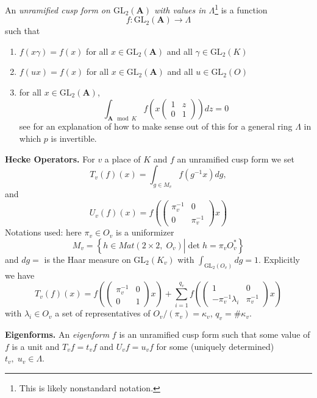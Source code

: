 \begin{definition}
\label{definition-unramified}
An {\it unramified cusp form on $\text{GL}_2(\mathbf{A})$ with values in
$\Lambda$}\footnote{This is likely nonstandard notation.}
is a function
$$
f: \text{GL}_2(\mathbf{A}) \to \Lambda
$$
such that
\begin{enumerate}
\item $f(x\gamma) = f(x)$ for all $x\in \text{GL}_2(\mathbf{A})$ and all
$\gamma\in \text{GL}_2(K)$
\item $f(ux) = f(x)$ for all $x\in \text{GL}_2(\mathbf{A})$ and all
$u\in \text{GL}_2(O)$
\item for all $x\in \text{GL}_2(\mathbf{A})$,
$$
\int_{\mathbf{A} \mod K} f
\left(x
\left(
\begin{matrix}
1 & z \\
0 & 1
\end{matrix}
\right)
\right) dz = 0
$$
see \cite[Section 4.1]{dJ-conjecture}
for an explanation of how to make sense out
of this for a general ring $\Lambda$ in which $p$ is invertible.
\end{enumerate}
\end{definition}

\medskip\noindent
{\bf Hecke Operators.}
For $v$ a place of $K$ and $f$ an unramified cusp form we set
$$
T_v(f)(x) =
\int_{g\in M_v}f(g^{-1}x)dg,
$$
and
$$
U_v(f)(x) =
f\left(
\left(
\begin{matrix}
\pi_v^{-1} & 0 \\ 0 & \pi_v^{-1}
\end{matrix}
\right)x\right)
$$
Notations used: here $\pi_v \in O_v$ is a uniformizer
$$
M_v =
\left\{
h\in Mat(2\times 2, \; O_v)
\left| \det h = \pi_vO_v^*\right.
\right\}
$$
and $dg=$ is the Haar measure on $\text{GL}_2(K_v)$ with
$\int_{\text{GL}_2(O_v)} dg = 1$. Explicitly we have
$$
T_v(f)(x) =
f\left(
\left(
\begin{matrix}
\pi_v^{-1}& 0 \\ 0 & 1
\end{matrix}
\right)
x\right) +
\sum_{i=1}^{q_v}
f\left(\left(
\begin{matrix}
1 & 0 \\ -\pi_v^{-1}\lambda_i
& \pi_v^{-1}
\end{matrix}
\right) x\right)
$$
with $\lambda_i\in O_v$ a set of representatives of
$O_v/(\pi_v)=\kappa_v$, $q_v = \#\kappa_v$.

\medskip\noindent
{\bf Eigenforms.} An {\it eigenform} $f$ is an unramified cusp form
such that some value of $f$ is a unit and $T_vf = t_vf$ and
$U_vf = u_vf$ for some (uniquely determined) $t_v, \; u_v \in \Lambda$.

